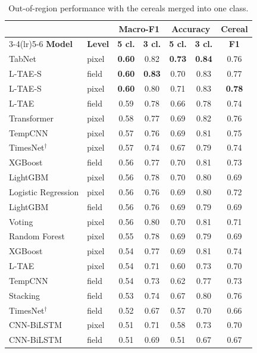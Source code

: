 \documentclass[preprint,authoryear,3p]{elsarticle}
\begin{document}
\begin{table}[!ht]
\centering
\caption{Out-of-region performance with the cereals merged into one class.}
\label{stab:cereal}
\renewcommand{\arraystretch}{1.08}
\setlength{\tabcolsep}{5pt}
\footnotesize
\begin{tabular}{llccccc}
\toprule
 & & \multicolumn{2}{c}{\textbf{Macro-F1}} & \multicolumn{2}{c}{\textbf{Accuracy}} & \textbf{Cereal} \\
\cmidrule(lr){3-4}\cmidrule(lr){5-6}
\textbf{Model} & \textbf{Level} & \textbf{5 cl.} & \textbf{3 cl.} & \textbf{5 cl.} & \textbf{3 cl.} & \textbf{F1} \\
\midrule
TabNet & pixel & \textbf{0.60} & 0.82 & \textbf{0.73} & \textbf{0.84} & 0.76 \\
L-TAE-S & field & \textbf{0.60} & \textbf{0.83} & 0.70 & 0.83 & 0.77 \\
L-TAE-S & pixel & \textbf{0.60} & 0.80 & 0.71 & 0.83 & \textbf{0.78} \\
L-TAE & field & 0.59 & 0.78 & 0.66 & 0.78 & 0.74 \\
Transformer & pixel & 0.58 & 0.77 & 0.69 & 0.82 & 0.76 \\
TempCNN & pixel & 0.57 & 0.76 & 0.69 & 0.81 & 0.75 \\
TimesNet$^{\dagger}$ & pixel & 0.57 & 0.74 & 0.67 & 0.79 & 0.74 \\
XGBoost & field & 0.56 & 0.77 & 0.70 & 0.81 & 0.73 \\
LightGBM & pixel & 0.56 & 0.78 & 0.70 & 0.80 & 0.69 \\
Logistic Regression & pixel & 0.56 & 0.76 & 0.69 & 0.80 & 0.72 \\
LightGBM & field & 0.56 & 0.76 & 0.69 & 0.79 & 0.69 \\
Voting & pixel & 0.56 & 0.80 & 0.70 & 0.81 & 0.71 \\
Random Forest & pixel & 0.55 & 0.78 & 0.69 & 0.79 & 0.69 \\
XGBoost & pixel & 0.54 & 0.77 & 0.69 & 0.81 & 0.74 \\
L-TAE & pixel & 0.54 & 0.71 & 0.60 & 0.73 & 0.70 \\
TempCNN & field & 0.54 & 0.73 & 0.62 & 0.77 & 0.73 \\
Stacking & field & 0.53 & 0.74 & 0.67 & 0.80 & 0.76 \\
TimesNet$^{\dagger}$ & field & 0.52 & 0.67 & 0.57 & 0.70 & 0.66 \\
CNN-BiLSTM & pixel & 0.51 & 0.71 & 0.58 & 0.73 & 0.70 \\
CNN-BiLSTM & field & 0.51 & 0.69 & 0.51 & 0.67 & 0.67 \\

\end{tabular}
\end{table}
\end{document}

